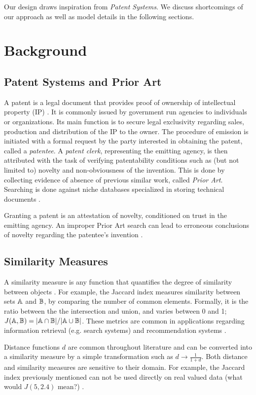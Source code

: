 \documentclass[conference]{IEEEtran}
\begin{document}
Our design draws inspiration from \emph{Patent Systems}. We discuss shortcomings of our approach as well as model details in the following sections.

\section{Background}
\subsection{Patent Systems and Prior Art}
A patent is a legal document that provides proof of ownership of intellectual property (IP) \cite{callaert2006traces}. It is commonly issued by government run agencies to individuals or organizations. Its main function is to secure legal exclusivity regarding sales, production and distribution of the IP to the owner. The procedure of emission is initiated with a formal request by the party interested in obtaining the patent, called a \emph{patentee}. A \emph{patent clerk}, representing the emitting agency, is then attributed with the task of verifying patentability conditions such as (but not limited to) novelty and non-obviousness of the invention. This is done by collecting evidence of absence of previous similar work, called \emph{Prior Art}. Searching is done against niche databases specialized in storing technical documents \cite{callaert2006traces}.

Granting a patent is an attestation of novelty, conditioned on trust in the emitting agency. An improper Prior Art search can lead to erroneous conclusions of novelty regarding the patentee's invention \cite{bashir2010improving}. 

\subsection{Similarity Measures}
A similarity measure is any function that quantifies the degree of similarity between objects \cite{lesot2009similarity}. For example, the Jaccard index measures similarity between sets ${\mathbb{A}}$ and ${\mathbb{B}}$, by comparing the number of common elements. Formally, it is the ratio between the the intersection and union, and varies between 0 and 1; $J({\mathbb{A}}, {\mathbb{B}}) = \vert{\mathbb{A}}\cap{\mathbb{B}}\vert/\vert{\mathbb{A}}\cup{\mathbb{B}}\vert$. These metrics are common in applications regarding information retrieval (e.g. search systems) and recommendation systems \cite{metzler2007similarity}.

Distance functions $d$ are common throughout literature and can be converted into a similarity measure by a simple transformation such as $d \to \frac{1}{1+d}$. Both distance and similarity measures are sensitive to their domain. For example, the Jaccard index previously mentioned can not be used directly on real valued data (what would $J(5, 2.4)$ mean?)  \cite{lesot2009similarity}.
\end{document}

